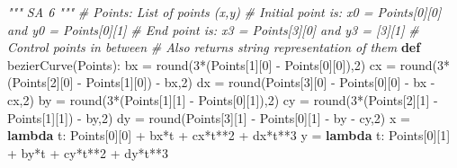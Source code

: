 \documentclass[11pt]{article}
\newenvironment{Shaded}{}{}
\newcommand{\KeywordTok}[1]{\textcolor[rgb]{0.00,0.44,0.13}{\textbf{{#1}}}}
\newcommand{\DecValTok}[1]{\textcolor[rgb]{0.25,0.63,0.44}{{#1}}}
\newcommand{\CommentTok}[1]{\textcolor[rgb]{0.38,0.63,0.69}{\textit{{#1}}}}
\newcommand{\NormalTok}[1]{{#1}}
\newcommand{\OperatorTok}[1]{\textcolor[rgb]{0.40,0.40,0.40}{{#1}}}
\newcommand{\BuiltInTok}[1]{{#1}}
\begin{document}
\begin{Shaded}
\begin{Highlighting}[]
\CommentTok{""" SA 6 """}
\CommentTok{# Points: List of points (x,y)}
\CommentTok{# Initial point is: x0 = Points[0][0] and y0 = Points[0][1]}
\CommentTok{# End point is: x3 = Points[3][0] and y3 = [3][1]}
\CommentTok{# Control points in between}
\CommentTok{# Also returns string representation of them}
\KeywordTok{def}\NormalTok{ bezierCurve(Points):}
\NormalTok{    bx }\OperatorTok{=} \BuiltInTok{round}\NormalTok{(}\DecValTok{3}\OperatorTok{*}\NormalTok{(Points[}\DecValTok{1}\NormalTok{][}\DecValTok{0}\NormalTok{] }\OperatorTok{-}\NormalTok{ Points[}\DecValTok{0}\NormalTok{][}\DecValTok{0}\NormalTok{]),}\DecValTok{2}\NormalTok{)}
\NormalTok{    cx }\OperatorTok{=} \BuiltInTok{round}\NormalTok{(}\DecValTok{3}\OperatorTok{*}\NormalTok{(Points[}\DecValTok{2}\NormalTok{][}\DecValTok{0}\NormalTok{] }\OperatorTok{-}\NormalTok{ Points[}\DecValTok{1}\NormalTok{][}\DecValTok{0}\NormalTok{]) }\OperatorTok{-}\NormalTok{ bx,}\DecValTok{2}\NormalTok{)}
\NormalTok{    dx }\OperatorTok{=} \BuiltInTok{round}\NormalTok{(Points[}\DecValTok{3}\NormalTok{][}\DecValTok{0}\NormalTok{] }\OperatorTok{-}\NormalTok{ Points[}\DecValTok{0}\NormalTok{][}\DecValTok{0}\NormalTok{] }\OperatorTok{-}\NormalTok{ bx }\OperatorTok{-}\NormalTok{ cx,}\DecValTok{2}\NormalTok{)}
\NormalTok{    by }\OperatorTok{=} \BuiltInTok{round}\NormalTok{(}\DecValTok{3}\OperatorTok{*}\NormalTok{(Points[}\DecValTok{1}\NormalTok{][}\DecValTok{1}\NormalTok{] }\OperatorTok{-}\NormalTok{ Points[}\DecValTok{0}\NormalTok{][}\DecValTok{1}\NormalTok{]),}\DecValTok{2}\NormalTok{)}
\NormalTok{    cy }\OperatorTok{=} \BuiltInTok{round}\NormalTok{(}\DecValTok{3}\OperatorTok{*}\NormalTok{(Points[}\DecValTok{2}\NormalTok{][}\DecValTok{1}\NormalTok{] }\OperatorTok{-}\NormalTok{ Points[}\DecValTok{1}\NormalTok{][}\DecValTok{1}\NormalTok{]) }\OperatorTok{-}\NormalTok{ by,}\DecValTok{2}\NormalTok{)}
\NormalTok{    dy }\OperatorTok{=} \BuiltInTok{round}\NormalTok{(Points[}\DecValTok{3}\NormalTok{][}\DecValTok{1}\NormalTok{] }\OperatorTok{-}\NormalTok{ Points[}\DecValTok{0}\NormalTok{][}\DecValTok{1}\NormalTok{] }\OperatorTok{-}\NormalTok{ by }\OperatorTok{-}\NormalTok{ cy,}\DecValTok{2}\NormalTok{)}
\NormalTok{    x }\OperatorTok{=} \KeywordTok{lambda}\NormalTok{ t: Points[}\DecValTok{0}\NormalTok{][}\DecValTok{0}\NormalTok{] }\OperatorTok{+}\NormalTok{ bx}\OperatorTok{*}\NormalTok{t }\OperatorTok{+}\NormalTok{ cx}\OperatorTok{*}\NormalTok{t}\OperatorTok{**}\DecValTok{2} \OperatorTok{+}\NormalTok{ dx}\OperatorTok{*}\NormalTok{t}\OperatorTok{**}\DecValTok{3}
\NormalTok{    y }\OperatorTok{=} \KeywordTok{lambda}\NormalTok{ t: Points[}\DecValTok{0}\NormalTok{][}\DecValTok{1}\NormalTok{] }\OperatorTok{+}\NormalTok{ by}\OperatorTok{*}\NormalTok{t }\OperatorTok{+}\NormalTok{ cy}\OperatorTok{*}\NormalTok{t}\OperatorTok{**}\DecValTok{2} \OperatorTok{+}\NormalTok{ dy}\OperatorTok{*}\NormalTok{t}\OperatorTok{**}\DecValTok{3}

\end{Highlighting}
\end{Shaded}
\end{document}
